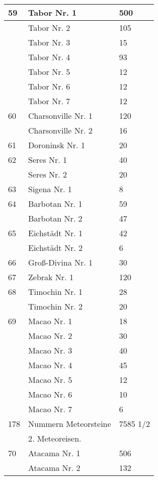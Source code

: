 \documentclass[a4paper, 11pt, oneside, polutonikogreek, german]{article}
\begin{document}
\begin{center}
\begin{longtable}{|l|l|l|}
        59 & Tabor Nr. 1 & 500 \\ \hline
          & Tabor Nr. 2 & 105 \\ \hline
          & Tabor Nr. 3 & 15 \\ \hline
          & Tabor Nr. 4 & 93 \\ \hline
          & Tabor Nr. 5 & 12 \\ \hline
          & Tabor Nr. 6 & 12 \\ \hline
          & Tabor Nr. 7 & 12 \\ \hline
        60 & Charsonville Nr. 1 & 120 \\ \hline
          & Charsonville Nr. 2 & 16 \\ \hline
        61 & Doroninsk Nr. 1 & 20 \\ \hline
        62 & Seres Nr. 1 & 40 \\ \hline
          & Seres Nr. 2 & 20 \\ \hline
        63 & Sigena Nr. 1 & 8 \\ \hline
        64 & Barbotan Nr. 1 & 59 \\ \hline
          & Barbotan Nr. 2 & 47 \\ \hline
        65 & Eichstädt Nr. 1 & 42 \\ \hline
          & Eichstädt Nr. 2 & 6 \\ \hline
        66 & Groß-Divina Nr. 1 & 30 \\ \hline
        67 & Zebrak Nr. 1 & 120 \\ \hline
        68 & Timochin Nr. 1 & 28 \\ \hline
          & Timochin Nr. 2 & 20 \\ \hline
        69 & Macao Nr. 1 & 18 \\ \hline
          & Macao Nr. 2 & 30 \\ \hline
          & Macao Nr. 3 & 40 \\ \hline
          & Macao Nr. 4 & 45 \\ \hline
          & Macao Nr. 5 & 12 \\ \hline
          & Macao Nr. 6 & 10 \\ \hline
          & Macao Nr. 7 & 6 \\ \hline
        178 & Nummern Meteorsteine & 7585 1/2 \\ \hline
          & 2. Meteoreisen. &   \\ \hline
        70 & Atacama Nr. 1 & 506 \\ \hline
          & Atacama Nr. 2 & 132 \\ \hline

\end{longtable}
\end{center}
\end{document}
